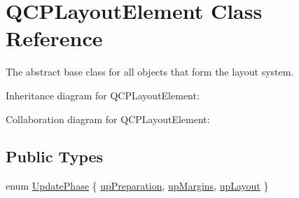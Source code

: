 \hypertarget{classQCPLayoutElement}{}\section{Q\+C\+P\+Layout\+Element Class Reference}
\label{classQCPLayoutElement}


The abstract base class for all objects that form the layout system.  




Inheritance diagram for Q\+C\+P\+Layout\+Element\+:


Collaboration diagram for Q\+C\+P\+Layout\+Element\+:
\subsection*{Public Types}
\begin{DoxyCompactItemize}
\item 
enum \hyperlink{classQCPLayoutElement_a0d83360e05735735aaf6d7983c56374d}{Update\+Phase} \{ \hyperlink{classQCPLayoutElement_a0d83360e05735735aaf6d7983c56374dad6119882eba136357c2f627992e527d3}{up\+Preparation}, 
\hyperlink{classQCPLayoutElement_a0d83360e05735735aaf6d7983c56374da288cb59a92280e47261a341f2813e676}{up\+Margins}, 
\hyperlink{classQCPLayoutElement_a0d83360e05735735aaf6d7983c56374da5d1ccf5d79967c232c3c511796860045}{up\+Layout}
 \}
\end{DoxyCompactItemize}
